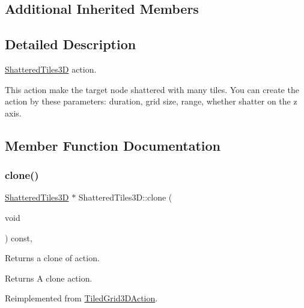 \subsection*{Additional Inherited Members}


\subsection{Detailed Description}
\hyperlink{classShatteredTiles3D}{Shattered\+Tiles3D} action. 

This action make the target node shattered with many tiles. You can create the action by these parameters\+: duration, grid size, range, whether shatter on the z axis. 

\subsection{Member Function Documentation}
\mbox{\label{classShatteredTiles3D_ae5b679ec020c8c3158c7b5c377d95c2f}} 
\subsubsection{\texorpdfstring{clone()}{clone()}\hspace{0.1cm}{\footnotesize\ttfamily [1/2]}}
{\footnotesize\ttfamily \hyperlink{classShatteredTiles3D}{Shattered\+Tiles3D} $\ast$ Shattered\+Tiles3\+D\+::clone (\begin{DoxyParamCaption}\item[{void}]{ }\end{DoxyParamCaption}) const\hspace{0.3cm}{\ttfamily [override]}, {\ttfamily [virtual]}}

Returns a clone of action.

\begin{DoxyReturn}{Returns}
A clone action. 
\end{DoxyReturn}


Reimplemented from \hyperlink{classTiledGrid3DAction_a689fd377cc0abae91db7def106529b53}{Tiled\+Grid3\+D\+Action}.

\mbox{\label{classShatteredTiles3D_a9612352337be5982ea8fa78bde1abf02}} 
